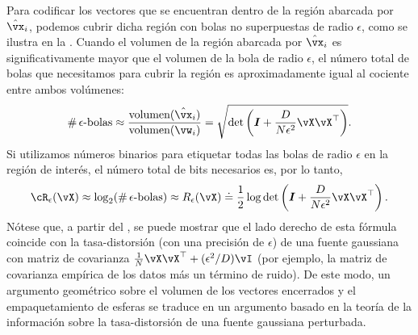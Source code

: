 \documentclass[../../book-main.tex]{subfiles}
\begin{document}
Para codificar los vectores que se encuentran dentro de la región abarcada por $\hat \vx_i$,
podemos cubrir dicha región con bolas no superpuestas
de radio $\epsilon$, como se ilustra en la
. Cuando el volumen de la región abarcada por
$\hat \vx_i$ es significativamente mayor que el volumen de la
bola de radio $\epsilon$, el número total de bolas que necesitamos para cubrir la región es
aproximadamente igual al cociente entre ambos volúmenes:
\begin{equation}
    \# \,\epsilon\mbox{-bolas} \approx \frac{\mbox{volumen}(\hat
    \vx_i)}{\mbox{volumen}(\vw_i)} = \sqrt{\det\left(\boldsymbol{I} +
    \frac{D}{N\epsilon^2} \vX\vX^\top  \right)}.
\end{equation}
Si utilizamos números binarios para etiquetar todas las bolas de radio $\epsilon$ en la región de
interés, el número total de bits necesarios es, por lo tanto, %
\begin{equation}
    \cR_{\epsilon}(\vX) \approx %
    \log_2 (\# \,\epsilon\mbox{-bolas}) \approx R_{\epsilon}(\vX)
    \doteq \frac{1}{2} \log \det \left(\boldsymbol{I} +
    \frac{D}{N\epsilon^2} \vX\vX^\top \right).
    \label{eqn:rate-Gaussian}
\end{equation}
Nótese que, a partir del , se puede mostrar que
el lado derecho de esta fórmula coincide con la 
tasa-distorsión (con una precisión de \(\epsilon\)) de una fuente gaussiana con
matriz de covarianza \(\frac{1}{N} \vX\vX^\top + (\epsilon^{2}/D) \vI\)
(por ejemplo, la matriz de covarianza empírica de los datos más un
término de ruido). De este modo, un argumento geométrico sobre el volumen de los
vectores encerrados y el empaquetamiento de esferas se traduce en un
argumento basado en la teoría de la información sobre la tasa-distorsión de una
fuente gaussiana perturbada.
\end{document}
